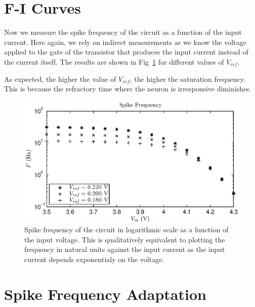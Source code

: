 \section{F-I Curves}
Now we measure the spike frequency of the circuit as a function of the input current. Here again, we rely on indirect measurements as we know the voltage applied to the gate of the transistor that produces the input current instead of the current itself. The results are shown in Fig~\ref{fig:exp1b} for different values of $V_{ref}$.

As expected, the higher the value of $V_{ref}$, the higher the saturation frequency. This is because the refractory time where the neuron is irresponsive diminishes. \\

\begin{figure}[!h]
	\center
	\includegraphics{exp1b.eps}
	\caption{Spike frequency of the circuit in logarithmic scale as a function of the input voltage. This is qualitatively equivalent to plotting the frequency in natural units against the input current as the input current depends exponentialy on the voltage.}
	\label{fig:exp1b}
\end{figure}


\section{Spike Frequency Adaptation}



